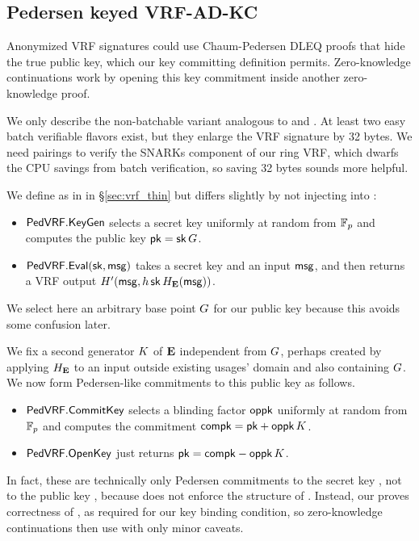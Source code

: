 \subsection{Pedersen keyed VRF-AD-KC}
\label{sec:vrf_perderson}

Anonymized VRF signatures could use Chaum-Pedersen DLEQ proofs that
hide the true public key, which our key committing definition permits.
Zero-knowledge continuations work by opening this key commitment
 inside another zero-knowledge proof. %

We only describe the non-batchable variant analogous to
 \cite{nsec5} and \cite{VXEd25519}.
At least two easy batch verifiable flavors exist, but
 they enlarge the VRF signature by 32 bytes.
We need pairings to verify the SNARKs component of our ring VRF,
which dwarfs the CPU savings from batch verification,
so saving 32 bytes sounds more helpful.


\newcommand{\PedVRF}{\primalgo{PedVRF}} 

We define \KeyGen as in \ThinVRF in \S\ref{sec:vrf_thin} but \Eval differs
slightly by not injecting \pk into \msg:
\begin{itemize}
\item $\PedVRF.\KeyGen$ selects a secret key \sk uniformly at random from $\mathbb{F}_p$ and computes the public key $\mathsf{pk} = \mathsf{sk} \, G$. 
\item $\PedVRF.\Eval(\sk,\msg)$ takes a secret key \sk and an input $\mathsf{msg}$, and
 then returns a VRF output $H'(\mathsf{msg},h \, \mathsf{sk} \, H_{{\mathbf{E}}}(\mathsf{msg}))$.
\end{itemize}
We select here an arbitrary base point $G$ for our public key
 because this avoids some confusion later.

We fix a second generator $K$ of ${\mathbf{E}}$ independent from $G$,
perhaps created by applying $H_{\mathbf{E}}$ to an input outside existing usages'
domain and also containing $G$. 
We now form Pedersen-like commitments to this public key \pk as follows.
\begin{itemize}
\item $\PedVRF.\CommitKey$ selects a blinding factor $\mathsf{oppk}$ uniformly
 at random from $\mathbb{F}_p$ and computes the commitment $\mathsf{compk} = \mathsf{pk} + \mathsf{oppk} \, K$.
\item $\PedVRF.\OpenKey$ just returns $\mathsf{pk} = \mathsf{compk} - \mathsf{oppk} \, K$.
\end{itemize}
In fact, these are technically only Pedersen commitments to
the secret key \sk, not to the public key \pk, because
 \OpenKey does not enforce the structure of \pk.
Instead, our \Verify proves correctness of \compk, as
 required for our key binding condition, so
zero-knowledge continuations then use \OpenKey with only minor caveats.

